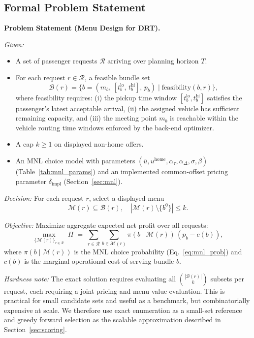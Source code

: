 \subsection{Formal Problem Statement}
\label{sec:problem_statement}

\noindent\textbf{Problem Statement (Menu Design for DRT).}

\medskip
\noindent\textit{Given:}
\begin{itemize}
  \item A set of passenger requests $\mathcal{R}$ arriving over planning horizon $T$.
  \item For each request $r \in \mathcal{R}$, a feasible bundle set
    \[
      \mathcal{B}(r) = \bigl\{ b = (m_b,\,[t_b^{\text{lo}},\,t_b^{\text{hi}}],\,p_b) \;\big|\; \text{feasibility}(b, r) \bigr\},
    \]
    where feasibility requires: (i) the pickup time window $[t_b^{\text{lo}}, t_b^{\text{hi}}]$ satisfies the passenger's latest acceptable arrival, (ii) the assigned vehicle has sufficient remaining capacity, and (iii) the meeting point $m_b$ is reachable within the vehicle routing time windows enforced by the back-end optimizer.
  \item A cap $k \geq 1$ on displayed non-home offers.
  \item An MNL choice model with parameters $(\bar{u}, u^{\text{home}}, \alpha_\tau, \alpha_\Delta, \sigma, \beta)$ (Table~\ref{tab:mnl_params}) and an implemented common-offset pricing parameter $\delta_{\text{impl}}$ (Section~\ref{sec:mnl}).
\end{itemize}

\noindent\textit{Decision:} For each request $r$, select a displayed menu
\[
  \mathcal{M}(r) \subseteq \mathcal{B}(r), \quad |\mathcal{M}(r) \setminus \{b^0\}| \leq k.
\]

\noindent\textit{Objective:} Maximize aggregate expected net profit over all requests:
\[
  \max_{\{\mathcal{M}(r)\}_{r \in \mathcal{R}}} \;\Pi \;=\; \sum_{r \in \mathcal{R}} \sum_{b \in \mathcal{M}(r)} \pi(b \mid \mathcal{M}(r))\,(p_b - c(b)),
\]
where $\pi(b \mid \mathcal{M}(r))$ is the MNL choice probability (Eq.~\ref{eq:mnl_prob}) and $c(b)$ is the marginal operational cost of serving bundle $b$.

\noindent\textit{Hardness note:} The exact solution requires evaluating all $\binom{|\mathcal{B}(r)|}{k}$ subsets per request, each requiring a joint pricing and menu-value evaluation. This is practical for small candidate sets and useful as a benchmark, but combinatorially expensive at scale. We therefore use exact enumeration as a small-set reference and greedy forward selection as the scalable approximation described in Section~\ref{sec:scoring}.

